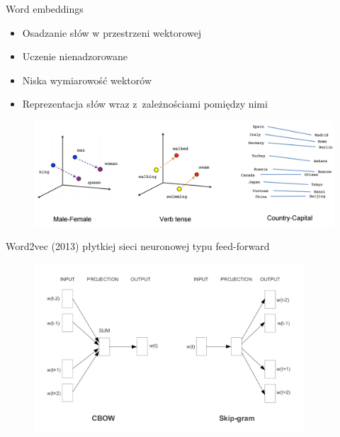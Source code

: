 \documentclass{beamer}
\begin{document}
	\begin{frame}{Word embeddings}
		\begin{itemize}
			\item Osadzanie słów w przestrzeni wektorowej
			\item Uczenie nienadzorowane
			\item Niska wymiarowość wektorów
			\item Reprezentacja słów wraz z~zależnościami pomiędzy nimi
		\end{itemize}
		\pause
		\begin{figure}
			\centering
			\includegraphics[width=1\textwidth]{img/linear-relationships.png}
		\end{figure}
	\end{frame}
	\begin{frame}{Word2vec (2013)}
		płytkiej sieci neuronowej typu feed-forward
		\begin{figure}[H]
			\centering
			\includegraphics[width=0.9\textwidth]{img/skipgram_cbow.png}
		\end{figure}
	\end{frame}
\end{document}
